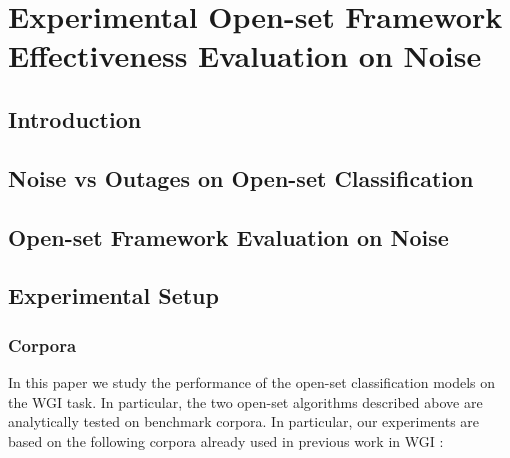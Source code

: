 
\chapter{Experimental Open-set Framework Effectiveness Evaluation on Noise}

\label{chap:noise}


\newcommand{\keyword}[1]{\textbf{#1}}
\newcommand{\tabhead}[1]{\textbf{#1}}
\newcommand{\code}[1]{\texttt{#1}}
\newcommand{\file}[1]{\texttt{\bfseries#1}}
\newcommand{\option}[1]{\texttt{\itshape#1}}


\section{Introduction}\label{chap:noise:sec:intro}

\section{Noise vs Outages on Open-set Classification}\label{chap:noise:sec:noise_vs_outages}

\section{Open-set Framework Evaluation on Noise}\label{chap:noise:sec:openset_evaluation}



\section{Experimental Setup}\label{chap:noise:sec:experimental_setup}

\subsection{Corpora}\label{chap:noise:sec:corpora}
In this paper we study the performance of the open-set classification models on the WGI task. In particular, the two open-set algorithms described above are analytically tested on benchmark corpora. In particular, our experiments are based on the following corpora already used in previous work in WGI \parencite{meyer2004genre,santini2007automatic,kanaris2009learning}:

